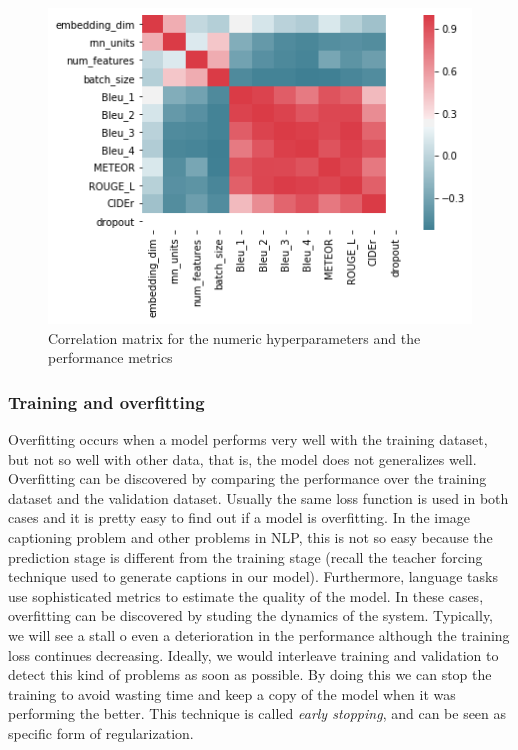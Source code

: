 \begin{figure}[hpt]
	\centering
	\includegraphics[scale=0.7]{images/ch5/correlation_matrix.png}
	\caption{Correlation matrix for the numeric hyperparameters and the performance metrics}
	\label{fig:correlation_matrix}
\end{figure}

\subsubsection{Training and overfitting}

Overfitting occurs when a model performs very well with the training dataset, but not so well with other data, that is, the model does not generalizes well.
Overfitting can be discovered by comparing the performance over the training dataset and the validation dataset. Usually the same loss function is used in both cases and it is pretty easy to find out if a model is overfitting. In the image captioning problem and other problems in NLP, this is not so easy because the prediction stage is different from the training stage (recall the teacher forcing technique used to generate captions in our model). Furthermore, language tasks use sophisticated metrics to estimate the quality of the model. In these cases, overfitting can be discovered by studing the dynamics of the system. Typically, we will see a stall o even a deterioration in the performance although the training loss continues decreasing. Ideally, we would interleave training and validation to detect this kind of problems as soon as possible. By doing this we can stop the training to avoid wasting time and keep a copy of the model when it was performing the better. This technique is called \textit{early stopping}, and can be seen as specific form of regularization. 

